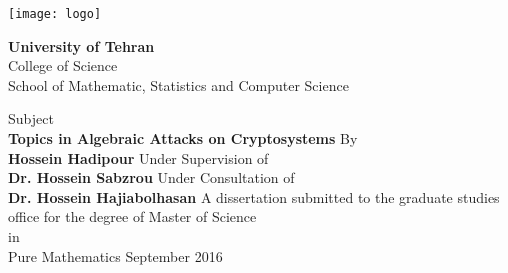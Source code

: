 \thispagestyle{empty}
\vspace*{-14mm}
\begin{center}
\begin{latin}
\texttt{[image: logo]} \\
\begin{Large}
\textbf{University of Tehran} \\
College of Science\\
School of Mathematic, Statistics and Computer Science
\end{Large}
\vskip 1.5cm
\large{Subject} \\   
\huge{\textbf{Topics in Algebraic Attacks on Cryptosystems}}
\vskip 1cm
\large{By}  \\       
\Large{\textbf{Hossein Hadipour}}
\vskip 1cm
\large{Under Supervision of} \\
\Large{\textbf{Dr. Hossein Sabzrou}}
\vskip 1cm
\large{Under Consultation of}\\
\large\textbf{Dr. Hossein Hajiabolhasan}
\vskip 0.5cm
A dissertation submitted to the graduate studies \\ 
office for the degree of Master of Science\\ 
in\\
Pure Mathematics
\vskip 0.7cm
\large{September 2016}
\end{latin}
\end{center}